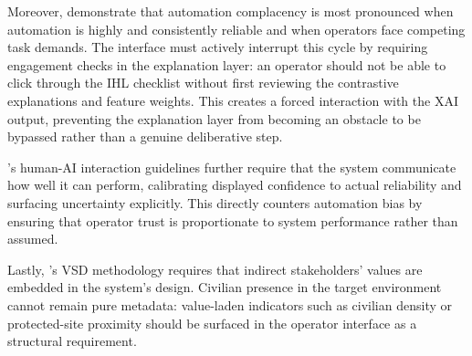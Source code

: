 Moreover, \citet{parasuraman2010complacency} demonstrate that automation complacency is most pronounced when automation is highly and consistently reliable and when operators face competing task demands. The interface must actively interrupt this cycle by requiring engagement checks in the explanation layer: an operator should not be able to click through the IHL checklist without first reviewing the contrastive explanations and feature weights. This creates a forced interaction with the XAI output, preventing the explanation layer from becoming an obstacle to be bypassed rather than a genuine deliberative step.

\citet{amershi2019guidelines}'s human-AI interaction guidelines further require that the system communicate how well it can perform, calibrating displayed confidence to actual reliability and surfacing uncertainty explicitly. This directly counters automation bias by ensuring that operator trust is proportionate to system performance rather than assumed.



Lastly, \citet{friedman2013vsd}'s VSD methodology requires that indirect stakeholders' values are embedded in the system's design. Civilian presence in the target environment cannot remain pure metadata: value-laden indicators such as civilian density or protected-site proximity should be surfaced in the operator interface as a structural requirement.

